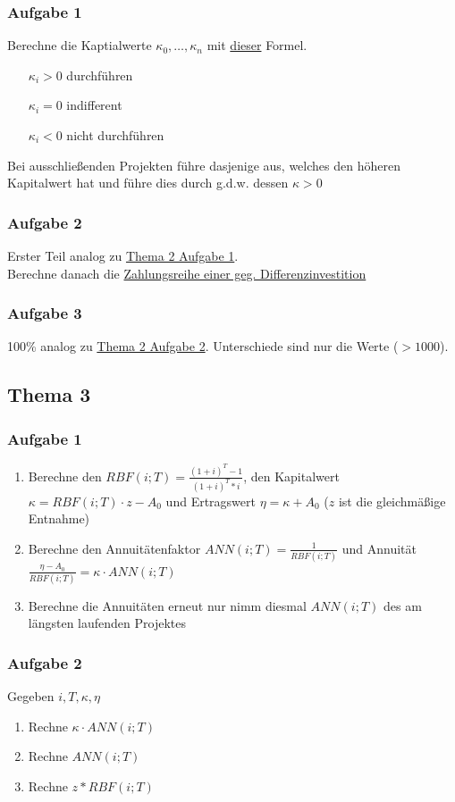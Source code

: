 		\subsubsection*{Aufgabe 1}\label{Thema2Aufgabe1}
		Berechne die Kaptialwerte $\kappa_0, \dots, \kappa_n$ mit \hyperref[Kapitalwert]{dieser} Formel.
		\begin{itemize}
			\setlength{\itemindent}{1cm}
			\item[$\kappa_i>0$] durchführen
			\item[$\kappa_i =0$] indifferent
			\item[$\kappa_i<0$] nicht durchführen
		\end{itemize}
		Bei ausschließenden Projekten führe dasjenige aus, welches den höheren Kapitalwert hat und führe dies durch g.d.w. dessen $\kappa>0$
		\subsubsection*{Aufgabe 2}\label{Thema2Aufgabe2}
		Erster Teil analog zu \hyperref[Thema2Aufgabe1]{Thema 2 Aufgabe 1}. \\
		Berechne danach die \hyperref[Differenzinvestition]{Zahlungsreihe einer geg. Differenzinvestition}
		\subsubsection*{Aufgabe 3}
		100\% analog zu \hyperref[Thema2Aufgabe2]{Thema 2 Aufgabe 2}. Unterschiede sind nur die Werte ($> 1000$).
	\subsection*{Thema 3}
		\subsubsection*{Aufgabe 1}
		\begin{enumerate}
			\item Berechne den $RBF(i;T)=\frac{(1+i)^T-1}{(1+i)^T*i}$, den Kapitalwert $\kappa=RBF(i;T)\cdot z -A_0$ und Ertragswert $\eta = \kappa + A_0$ ($z$ ist die gleichmäßige Entnahme)
			\item Berechne den Annuitätenfaktor $ANN(i;T)=\frac{1}{RBF(i;T)}$ und Annuität $\frac{\eta-A_0}{RBF(i;T)} = \kappa\cdot ANN(i;T)$
			\item Berechne die Annuitäten erneut nur nimm diesmal $ANN(i;T)$ des am längsten laufenden Projektes
		\end{enumerate}
		\subsubsection*{Aufgabe 2}
		Gegeben $i, T, \kappa, \eta$
		\begin{enumerate}[label=\alph*)]
			\item Rechne $\kappa \cdot ANN(i;T)$
			\item Rechne $ANN(i;T)$
			\item Rechne $z*RBF(i;T)$
		\end{enumerate}
